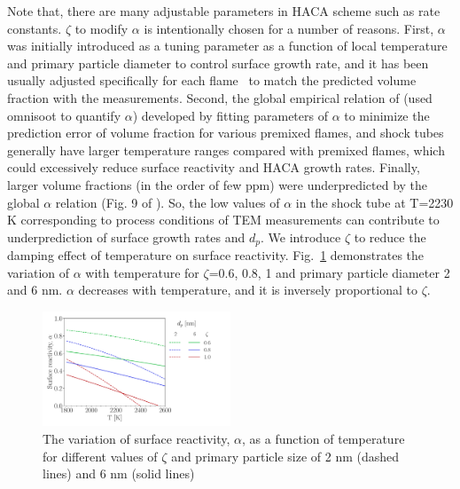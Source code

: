 Note that, there are many adjustable parameters in HACA scheme such as rate constants. $\zeta$ to modify $\alpha$ is intentionally chosen for a number of reasons. First, $\alpha$ was initially introduced as a tuning parameter as a function of local temperature and primary particle diameter to control surface growth rate, and it has been usually adjusted specifically for each flame~\citep{castaldi1996pah, xu1997soot} to match the predicted volume fraction with the measurements. Second, the global empirical relation of \citet{appel2000kinetic} (used omnisoot to quantify $\alpha$) developed by fitting parameters of $\alpha$ to minimize the prediction error of volume fraction for various premixed flames, and shock tubes generally have larger temperature ranges compared with premixed flames, which could excessively reduce surface reactivity and HACA growth rates. Finally, larger volume fractions (in the order of few ppm) were underpredicted by the global $\alpha$ relation (Fig. 9 of \citep{appel2000kinetic}). So, the low values of $\alpha$ in the shock tube at T=2230 K corresponding to process conditions of TEM measurements can contribute to underprediction of surface growth rates and $d_p$. We introduce $\zeta$ to reduce the damping effect of temperature on surface reactivity. Fig.~\ref{fig:shocktube_alpha_HACA} demonstrates the variation of $\alpha$ with temperature for $\zeta$=0.6, 0.8, 1 and primary particle diameter 2 and 6 nm. $\alpha$ decreases with temperature, and it is inversely proportional to $\zeta$. 

\begin{figure}[H]
	\centering
	\includegraphics[width=0.5\textwidth]{Figures/Results/Shocktube/HACA/alpha.pdf}
	\caption{The variation of surface reactivity, $\alpha$, as a function of temperature for different values of $\zeta$ and primary particle size of 2 nm (dashed lines) and 6 nm (solid lines)}
	\label{fig:shocktube_alpha_HACA} 
\end{figure}

